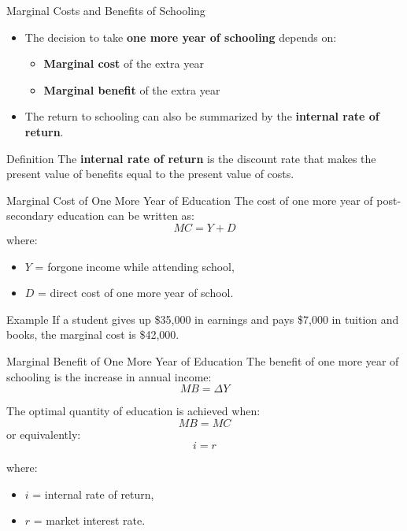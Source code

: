 \documentclass[aspectratio=169]{beamer}
\begin{document}
\begin{frame}{Marginal Costs and Benefits of Schooling}
\transfade
\begin{itemize}
  \item The decision to take \textbf{one more year of schooling} depends on:
  \begin{itemize}
    \item \textbf{Marginal cost} of the extra year
    \item \textbf{Marginal benefit} of the extra year
  \end{itemize}
  \item The return to schooling can also be summarized by the \textbf{internal rate of return}.
\end{itemize}

\begin{block}{Definition}
The \textbf{internal rate of return} is the discount rate that makes the present value of benefits equal to the present value of costs.
\end{block}
\end{frame}

\begin{frame}{Marginal Cost of One More Year of Education}
\transfade
The cost of one more year of post-secondary education can be written as:
\[
MC = Y + D
\]
where:
\begin{itemize}
  \item \(Y\) = forgone income while attending school,
  \item \(D\) = direct cost of one more year of school.
\end{itemize}

\begin{exampleblock}{Example}
If a student gives up \$35,000 in earnings and pays \$7,000 in tuition and books, the marginal cost is \$42,000.
\end{exampleblock}
\end{frame}

\begin{frame}{Marginal Benefit of One More Year of Education}
\transfade
The benefit of one more year of schooling is the increase in annual income:
\[
MB = \Delta Y
\]

The optimal quantity of education is achieved when:
\[
MB = MC
\]
or equivalently:
\[
i = r
\]

where:
\begin{itemize}
  \item \(i\) = internal rate of return,
  \item \(r\) = market interest rate.
\end{itemize}
\end{frame}
\end{document}
